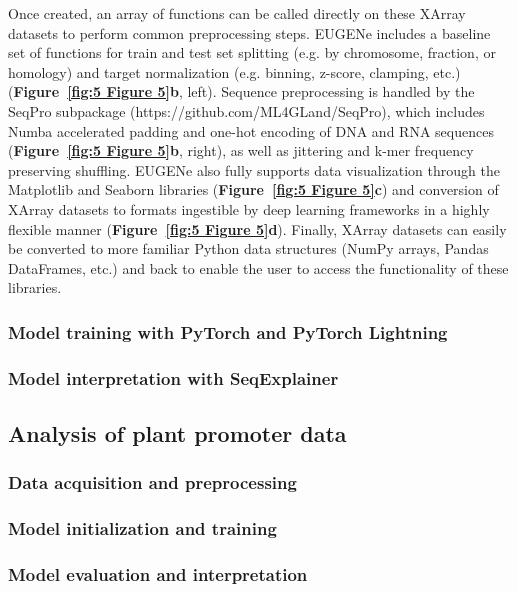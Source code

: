 Once created, an array of functions can be called directly on these XArray datasets to perform common preprocessing steps. EUGENe includes a baseline set of functions for train and test set splitting (e.g. by chromosome, fraction, or homology\cite{Teufel2023-kn}) and target normalization (e.g. binning, z-score, clamping, etc.) (\textbf{Figure~\ref{fig:5 Figure 5}\textbf{b}}, left). Sequence preprocessing is handled by the SeqPro subpackage (https://github.com/ML4GLand/SeqPro), which includes Numba accelerated\cite{Lam2015-mo} padding and one-hot encoding of DNA and RNA sequences (\textbf{Figure~\ref{fig:5 Figure 5}\textbf{b}}, right), as well as jittering and k-mer frequency preserving shuffling\cite{Jiang2008-li}. EUGENe also fully supports data visualization through the Matplotlib\cite{Hunter2007-es} and Seaborn\cite{Waskom2021-lk} libraries (\textbf{Figure~\ref{fig:5 Figure 5}\textbf{c}}) and conversion of XArray datasets to formats ingestible by deep learning frameworks in a highly flexible manner (\textbf{Figure~\ref{fig:5 Figure 5}\textbf{d}}). Finally, XArray datasets can easily be converted to more familiar Python data structures (NumPy arrays, Pandas DataFrames, etc.) and back to enable the user to access the functionality of these libraries.

\subsubsection{Model training with PyTorch and PyTorch Lightning}

\subsubsection{Model interpretation with SeqExplainer}

\subsection{Analysis of plant promoter data}

\subsubsection{Data acquisition and preprocessing}

\subsubsection{Model initialization and training}

\subsubsection{Model evaluation and interpretation}

